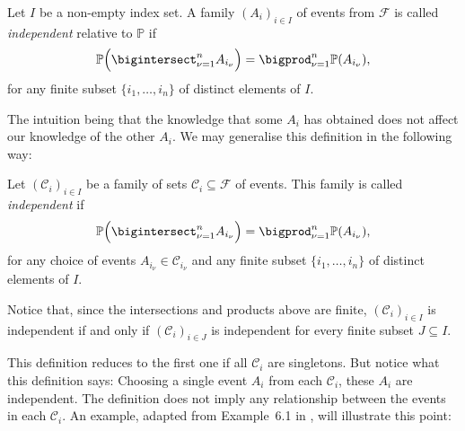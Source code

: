 \documentclass[article, a4paper, 11pt, oneside]{memoir}
\numberwithin{equation}{chapter}
\newcommand{\calF}{\mathcal{F}}
\newcommand{\calC}{\mathcal{C}}
\renewcommand{\P}{\mathbb{P}}
\begin{document}
\begin{definition}[Independence I]
    \label{def:independence-1}
    Let $I$ be a non-empty index set. A family $(A_i)_{i \in I}$ of events from $\calF$ is called \emph{independent} relative to $\P$ if
    \begin{equation*}
        \P \Bigl( \bigintersect_{\nu = 1}^n A_{i_\nu} \Bigr)
            = \bigprod_{\nu = 1}^n \P(A_{i_\nu}),
    \end{equation*}
    for any finite subset $\{ i_1, \ldots, i_n \}$ of distinct elements of $I$.
\end{definition}
%
The intuition being that the knowledge that some $A_i$ has obtained does not affect our knowledge of the other $A_i$. We may generalise this definition in the following way:

\begin{definition}[Independence II]
    \label{def:independence-2}
    Let $(\calC_i)_{i \in I}$ be a family of sets $\calC_i \subseteq \calF$ of events. This family is called \emph{independent} if
    \begin{equation*}
        \P \Bigl( \bigintersect_{\nu = 1}^n A_{i_\nu} \Bigr)
            = \bigprod_{\nu = 1}^n \P(A_{i_\nu}),
    \end{equation*}
    for any choice of events $A_{i_\nu} \in \calC_{i_\nu}$ and any finite subset $\{ i_1, \ldots, i_n \}$ of distinct elements of $I$.
\end{definition}

\begin{remark}
    \label{rem:finite-subfamilies-independent}
    Notice that, since the intersections and products above are finite, $(\calC_i)_{i \in I}$ is independent if and only if $(\calC_i)_{i \in J}$ is independent for every finite subset $J \subseteq I$.
\end{remark}
%
This definition reduces to the first one if all $\calC_i$ are singletons. But notice what this definition says: Choosing a single event $A_i$ from each $\calC_i$, these $A_i$ are independent. The definition does not imply any relationship between the events in each $\calC_i$. An example, adapted from Example~6.1 in \textcite{bauer1995}, will illustrate this point:

\newcommand{\powerset}[1]{2^{#1}}
\end{document}
